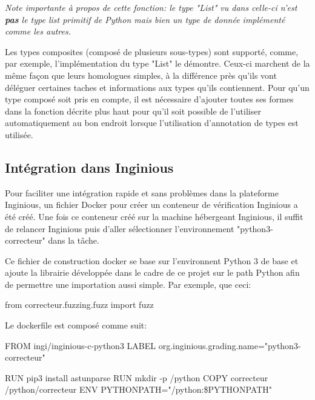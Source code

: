 \documentclass[a4paper]{report}
\begin{document}
\textit{Note importante à propos de cette fonction: le type "List" vu dans celle-ci n'est \textbf{pas} le type list primitif de Python mais bien un type de donnée implémenté comme les autres.}

Les types composites (composé de plusieurs sous-types) sont supporté, comme, par exemple, l'implémentation du type "List" le démontre.
Ceux-ci marchent de la même façon que leurs homologues simples, à la différence près qu'ils vont déléguer certaines taches et informations aux types qu'ils contiennent.
Pour qu'un type composé soit pris en compte, il est nécessaire d'ajouter toutes ses formes dans la fonction décrite plus haut pour qu'il soit possible de l'utiliser automatiquement au bon endroit lorsque l'utilisation d'annotation de types est utilisée.




\subsection{Intégration dans Inginious}

Pour faciliter une intégration rapide et sans problèmes dans la plateforme Inginious, un fichier Docker pour créer un conteneur de vérification Inginious a été créé.
Une fois ce conteneur créé sur la machine hébergeant Inginious, il suffit de relancer Inginious puis d'aller sélectionner l'environnement "python3-correcteur" dans la tâche.

Ce fichier de construction docker se base sur l'environnent Python 3 de base et ajoute la librairie développée dans le cadre de ce projet sur le path Python afin de permettre une importation aussi simple.
Par exemple, que ceci:

\begin{python}
from correcteur.fuzzing.fuzz import fuzz
\end{python}

Le dockerfile est composé comme suit:
\begin{python}
FROM ingi/inginious-c-python3
LABEL org.inginious.grading.name="python3-correcteur"


RUN pip3 install astunparse
RUN mkdir -p /python
COPY correcteur /python/correcteur
ENV PYTHONPATH="/python:\${PYTHONPATH}"
\end{python}
\end{document}
